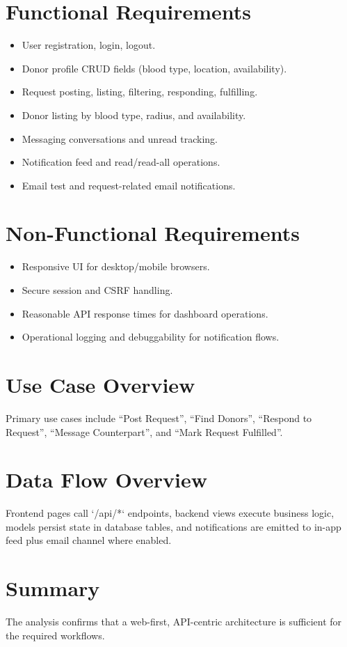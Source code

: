 \documentclass[12pt,a4paper]{report}
\begin{document}
\section{Functional Requirements}
\begin{itemize}[leftmargin=1.5em]
\item User registration, login, logout.
\item Donor profile CRUD fields (blood type, location, availability).
\item Request posting, listing, filtering, responding, fulfilling.
\item Donor listing by blood type, radius, and availability.
\item Messaging conversations and unread tracking.
\item Notification feed and read/read-all operations.
\item Email test and request-related email notifications.
\end{itemize}

\section{Non-Functional Requirements}
\begin{itemize}[leftmargin=1.5em]
\item Responsive UI for desktop/mobile browsers.
\item Secure session and CSRF handling.
\item Reasonable API response times for dashboard operations.
\item Operational logging and debuggability for notification flows.
\end{itemize}

\section{Use Case Overview}
Primary use cases include ``Post Request'', ``Find Donors'', ``Respond to Request'', ``Message Counterpart'', and ``Mark Request Fulfilled''.

\section{Data Flow Overview}
Frontend pages call `/api/*` endpoints, backend views execute business logic, models persist state in database tables, and notifications are emitted to in-app feed plus email channel where enabled.

\section{Summary}
The analysis confirms that a web-first, API-centric architecture is sufficient for the required workflows.
\end{document}
